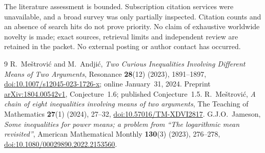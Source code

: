 \documentclass[11pt]{article}
\begin{document}
The literature assessment is bounded. Subscription citation services
were unavailable, and a broad survey was only partially inspected.
Citation counts and an absence of search hits do not prove priority.
No claim of exhaustive worldwide novelty is made; exact sources,
retrieval limits and independent review are retained in the packet.
No external posting or author contact has occurred.

\begin{thebibliography}{9}
R.~Me\v{s}trovi\'c and M.~Andji\'c,
\emph{Two Curious Inequalities Involving Different Means of Two
Arguments}, Resonance \textbf{28}(12) (2023), 1891--1897,
\href{https://doi.org/10.1007/s12045-023-1726-x}{doi:10.1007/s12045-023-1726-x};
online January~31, 2024.
Preprint \href{https://arxiv.org/abs/1804.00542v1}{arXiv:1804.00542v1},
Conjecture~1.6; published Conjecture~1.5.
R.~Me\v{s}trovi\'c, \emph{A chain of eight inequalities involving means
of two arguments}, The Teaching of Mathematics \textbf{27}(1)
(2024), 27--32,
\href{https://doi.org/10.57016/TM-XDVI2817}{doi:10.57016/TM-XDVI2817}.
G.J.O.~Jameson, \emph{Some inequalities for power means; a problem
from ``The logarithmic mean revisited''}, American Mathematical Monthly
\textbf{130}(3) (2023), 276--278,
\href{https://doi.org/10.1080/00029890.2022.2153560}{doi:10.1080/00029890.2022.2153560}.
\end{thebibliography}
\end{document}
